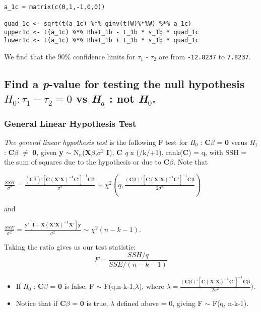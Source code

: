 \documentclass[11pt]{article}
\begin{document}
\begin{verbatim}

a_1c = matrix(c(0,1,-1,0,0))

quad_1c <- sqrt(t(a_1c) %*% ginv(t(W)%*%W) %*% a_1c)
upper1c <- t(a_1c) %*% Bhat_1b - t_1b * s_1b * quad_1c
lower1c <- t(a_1c) %*% Bhat_1b + t_1b * s_1b * quad_1c
\end{verbatim}

We find that the 90\% confidence limits for $\tau$$_1$ - $\tau$$_2$ are from \texttt{-12.8237} to \texttt{7.8237}. 
\subsection{Find a \emph{p}-value for testing the null hypothesis $H_0 : \tau_1 - \tau_2 = 0$ vs \emph{H$_a$} : not \emph{H$_0$}.}
\label{sec-1-4}
\label{Tau1Tau2H0}
\subsubsection{General Linear Hypothesis Test}
\label{sec-1-4-1}

\emph{The general linear hypothesis test} is the following F test for
\emph{H$_0$} : \textbf{C$\beta$} = \textbf{0} verus \emph{H$_1$} : \textbf{C$\beta$} $\neq$ \textbf{0}, given \textbf{y}
$\sim$ N$_n$(\textbf{X$\beta$},$\sigma$$^2$ \textbf{I}), \textbf{C} \emph{q} x (/k/+1), rank(\textbf{C}) = q, with SSH = the sum of squares due to
the hypothesis or due to \textbf{C$\beta$}. Note that 

\(\frac{SSH}{\sigma^2} = \frac{(\mathbf{C\hat{\beta}})'[\mathbf{C(X'X)^{-1}C}']^{-1}\mathbf{C\hat{\beta}}}{\sigma^2}
\sim
\chi^2(q,\frac{(\mathbf{C\beta})'[\mathbf{C(X'X)^{-1}C}']^{-1}\mathbf{C\beta}}{2\sigma^2})\)

\noindent and

\(\frac{SSE}{\sigma^2} = \frac{\mathbf{y}'[\mathbf{I} -
\mathbf{X(X'X)^{-1}X}']\mathbf{y}}{\sigma^2} \sim \chi^2(n-k-1).\)

Taking the ratio gives us our test statistic:
$$F = \frac{SSH/q}{SSE/(n-k-1)}$$

\begin{itemize}
\item If \emph{H$_0$} : \textbf{C$\beta$} = \textbf{0} is false, F $\sim$ F(q,n-k-1,$\lambda$), where
  $\lambda =
  \frac{(\mathbf{C\beta})'[\mathbf{C(X'X)^{-1}C}']^{-1}\mathbf{C\beta}}{2\sigma^2})$.
\item Notice that if \textbf{C$\beta$} = \textbf{0} is true, $\lambda$ defined above = 0, giving F
  $\sim$ F(q, n-k-1).
\end{itemize}
\end{document}

